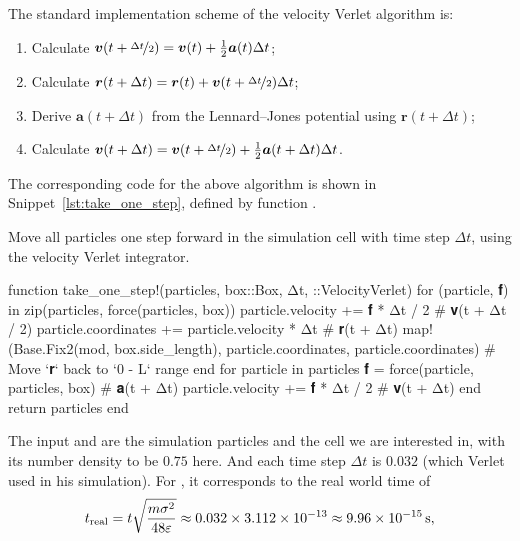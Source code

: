 The standard implementation scheme of the velocity Verlet algorithm is:
%
\begin{enumerate}
    \item Calculate \(\bm{v}(t + \nicefrac{\Delta t}{2}) = \bm{v}(t) + \frac{1}{2} \bm{a}(t) \Delta t\);\label{it:vv1}
    \item Calculate \(\bm{r}(t + \Delta t) = \bm{r}(t) + \bm{v}(t + \nicefrac{\Delta t}{2}) \Delta t\);\label{it:vv2}
    \item Derive \(\bm{a}(t + \Delta t)\) from the Lennard--Jones potential using \(\bm{r}(t + \Delta t)\);\label{it:vv3}
    \item Calculate \(\bm{v}(t + \Delta t) = \bm{v}(t + \nicefrac{\Delta t}{2}) + \frac{1}{2} \bm{a}(t + \Delta t) \Delta t\).\label{it:vv4}
\end{enumerate}
%
The corresponding code for the above algorithm is shown in Snippet~\ref{lst:take_one_step},
defined by function .
%
\begin{algorithm}
    \caption{Move all particles one step forward in the simulation cell with time step
        \(\Delta t\), using the velocity Verlet integrator.}
    \label{lst:take_one_step}
    \begin{juliacode}
        function take_one_step!(particles, box::Box, Δt, ::VelocityVerlet)
            for (particle, 𝐟) in zip(particles, force(particles, box))
                particle.velocity += 𝐟 * Δt / 2  # 𝐯(t + Δt / 2)
                particle.coordinates += particle.velocity * Δt  # 𝐫(t + Δt)
                map!(Base.Fix2(mod, box.side_length), particle.coordinates, particle.coordinates)  # Move `𝐫` back to `0 - L` range
            end
            for particle in particles
                𝐟 = force(particle, particles, box)  # 𝐚(t + Δt)
                particle.velocity += 𝐟 * Δt / 2  # 𝐯(t + Δt)
            end
            return particles
        end
    \end{juliacode}
\end{algorithm}
%
The input  and  are the simulation particles and the cell we
are interested in, with its number density to be \(0.75\) here. And each time step
\(\Delta t\) is \(0.032\) (which Verlet used in his simulation). For , it corresponds
to the real world time of
%
\begin{equation}
    t_\textnormal{real} = t \sqrt{\frac{ m \sigma^2 }{ 48 \varepsilon }}
    \approx 0.032 \times \num{3.112e-13}
    \approx \qty{9.96e-15}{\second},
\end{equation}
